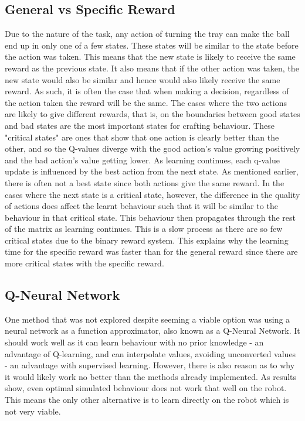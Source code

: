 \documentclass[12pt,a4paper]{article}
\begin{document}
\subsection{General vs Specific Reward}
Due to the nature of the task, any action of turning the tray can make the ball end up in only one of a few states. These states will be similar to the state before the action was taken. This means that the new state is likely to receive the same reward as the previous state. It also means that if the other action was taken, the new state would also be similar and hence would also likely receive the same reward. As such, it is often the case that when making a decision, regardless of the action taken the reward will be the same. The cases where the two actions are likely to give different rewards, that is, on the boundaries between good states and bad states are the most important states for crafting behaviour. These "critical states" are ones that show that one action is clearly better than the other, and so the Q-values diverge with the good action's value growing positively and the bad action's value getting lower. As learning continues, each q-value update is influenced by the best action from the next state. As mentioned earlier, there is often not a best state since both actions give the same reward. In the cases where the next state is a critical state, however, the difference in the quality of actions does affect the learnt behaviour such that it will be similar to the behaviour in that critical state. This behaviour then propagates through the rest of the matrix as learning continues. This is a slow process as there are so few critical states due to the binary reward system. This explains why the learning time for the specific reward was faster than for the general reward since there are more critical states with the specific reward.

\subsection{Q-Neural Network}
One method that was not explored despite seeming a viable option was using a neural network as a function approximator, also known as a Q-Neural Network. It should work well as it can learn behaviour with no prior knowledge - an advantage of Q-learning, and can interpolate values, avoiding unconverted values - an advantage with supervised learning. However, there is also reason as to why it would likely work no better than the methods already implemented. As results show, even optimal simulated behaviour does not work that well on the robot. This means the only other alternative is to learn directly on the robot which is not very viable.
\end{document}
